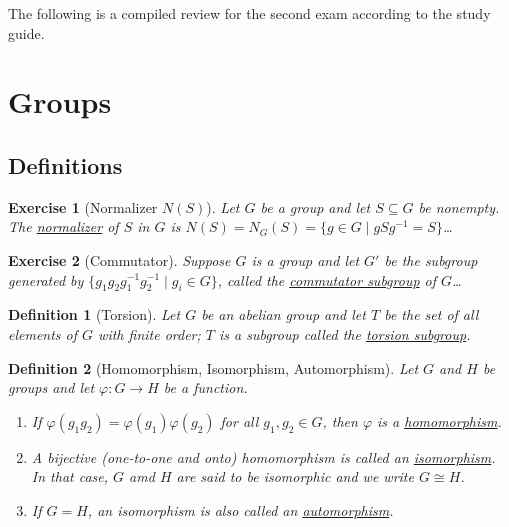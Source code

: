 \documentclass[12pt]{article}
\newtheorem{defn}{Definition}
\newtheorem{exer}{Exercise}
\numberwithin{problem}{section} %
\numberwithin{defn}{section} %
\numberwithin{thm}{section} %
\numberwithin{exer}{section} %
\numberwithin{lma}{section} %
\numberwithin{crlly}{section} %
\theoremstyle{remark}  %
\begin{document}
 
%
\rhead{\today}

The following is a compiled review for the second exam according to the study guide.

\renewcommand{\thesubsection}{\Alph{subsection}}

\setcounter{section}{1}  %
\section{Groups}
\setcounter{subsection}{0}  %
\subsection{Definitions}

\setcounter{exer}{71}
\begin{exer}[Normalizer $N(S)$]
    Let $G$ be a group and let $S\subseteq G$ be nonempty. The \ul{normalizer} of $S$ in $G$ is $N(S)=N_G(S)=\{g\in G \mid gSg^{-1}=S\}$\dots
\end{exer}

\begin{exer}[Commutator]
    Suppose $G$ is a group and let $G'$ be the subgroup generated by $\{g_1g_2g_1^{-1}g_2^{-1} \mid g_i \in G\}$, called the \ul{commutator subgroup} of $G$\dots
\end{exer}

\begin{defn}[Torsion]
    Let $G$ be an abelian group and let $T$ be the set of all elements of $G$ with finite order; $T$ is a subgroup called the \ul{torsion subgroup}. 
\end{defn}

\setcounter{defn}{19}
\begin{defn}[Homomorphism, Isomorphism, Automorphism]
    Let $G$ and $H$ be groups and let $\varphi\operatorname{:}G \to H$ be a function.
    \begin{enumerate}
        \item If $\varphi(g_1g_2)=\varphi(g_1)\varphi(g_2)$ for all $g_1,g_2\in G$, then $\varphi$ is a \ul{homomorphism}.
        \item A bijective (one-to-one and onto) homomorphism is called an \ul{isomorphism}. In that case, $G$ amd $H$ are said to be isomorphic and we write $G \cong H$.
        \item If $G=H$, an isomorphism is also called an \ul{automorphism}.
    \end{enumerate}
\end{defn}
\end{document}
